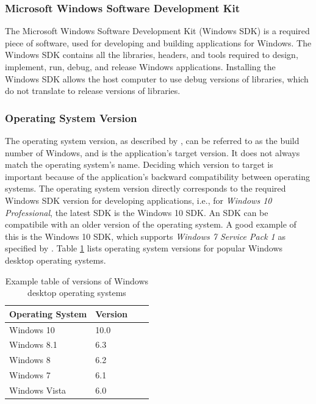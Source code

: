 \subsubsection{Microsoft Windows Software Development Kit}
The Microsoft Windows Software Development Kit (Windows SDK) is a required piece of software, used for developing and building applications for Windows. The Windows SDK contains all the libraries, headers, and tools required to design, implement, run, debug, and release Windows applications. Installing the Windows SDK allows the host computer to use debug versions of libraries, which do not translate to release versions of libraries.

\subsubsection{Operating System Version}
The operating system version, as described by \cite{OsVersion}, can be referred to as the build number of Windows, and is the application's target version. It does not always match the operating system's name. Deciding which version to target is important because of the application's backward compatibility between operating systems. The operating system version directly corresponds to the required Windows SDK version for developing applications, i.e., for \textit{Windows 10 Professional}, the latest SDK is the Windows 10 SDK. An SDK can be compatibile with an older version of the operating system. A good example of this is the Windows 10 SDK, which supports \textit{Windows 7 Service Pack 1} as specified by \cite{Win10SDK}. Table \ref{osversions} lists operating system versions for popular Windows desktop operating systems.
\begin{table}[hbt]
\centering
\label{osversions}
\begin{tabular}{|l|l|l|l|}
\hline
Operating System & Version \\ \hline
Windows 10       & 10.0    \\ \hline
Windows 8.1      & 6.3     \\ \hline
Windows 8        & 6.2     \\ \hline
Windows 7        & 6.1     \\ \hline
Windows Vista    & 6.0     \\ \hline
\end{tabular}
\caption{Example table of versions of Windows desktop operating systems}
\end{table}

